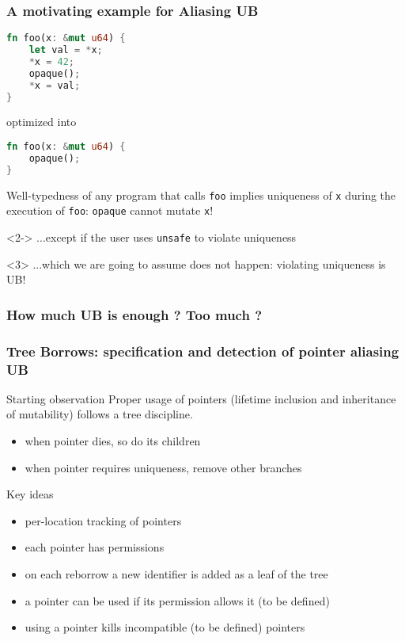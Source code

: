 \begin{frame}[fragile, t]
    \frametitle{A motivating example for Aliasing UB}
    \begin{lstlisting}[language=rust]
fn foo(x: &mut u64) {
    let val = *x;
    *x = 42;
    opaque();
    *x = val;
}
    \end{lstlisting}
    optimized into
    \begin{lstlisting}[language=rust]
fn foo(x: &mut u64) {
    opaque();
}
    \end{lstlisting}
    Well-typedness of any program that calls \texttt{foo} implies uniqueness
    of \texttt{x} during the execution of \texttt{foo}: \texttt{opaque} cannot mutate \texttt{x}!\\
    \begin{onlyenv}<2->
    ...except if the user uses \texttt{unsafe} to violate uniqueness \\
    \end{onlyenv}
    \begin{onlyenv}<3>
    ...which we are going to assume does not happen: violating uniqueness is UB!
    \end{onlyenv}
\end{frame}


\begin{frame}[fragile, t]
    \frametitle{How much UB is enough ? Too much ?}
    \vspace{-1em}
    \begin{figure}
    \end{figure}
\end{frame}

\begin{frame}[t]
    \frametitle{Tree Borrows: specification and detection of pointer aliasing UB}
    \begin{alertblock}{Starting observation}
        Proper usage of pointers (lifetime inclusion and inheritance of mutability) follows a tree discipline.
        \begin{itemize}
            \item when pointer dies, so do its children
            \item when pointer requires uniqueness, remove other branches
        \end{itemize}
    \end{alertblock}
    \begin{block}{Key ideas}
        \begin{itemize}
            \item per-location tracking of pointers
            \item each pointer has permissions
            \item on each reborrow a new identifier is added as a leaf of the tree
            \item a pointer can be used if its permission allows it (to be defined)
            \item using a pointer kills incompatible (to be defined) pointers
        \end{itemize}
    \end{block}
\end{frame}

